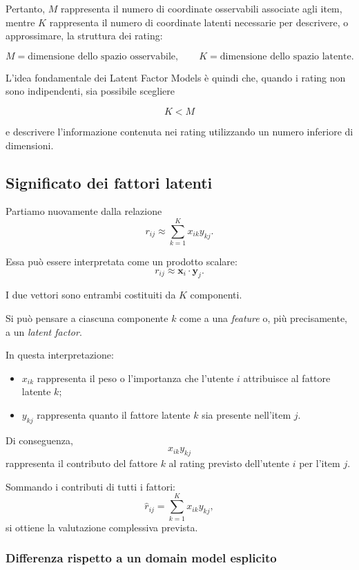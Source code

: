 Pertanto, \(M\) rappresenta il numero di coordinate osservabili associate agli item, mentre \(K\) rappresenta il numero di coordinate latenti necessarie per descrivere, o approssimare, la struttura dei rating:

\[
\boxed{
M=\text{dimensione dello spazio osservabile},
\qquad
K=\text{dimensione dello spazio latente}.
}
\]

L'idea fondamentale dei Latent Factor Models è quindi che, quando i rating non sono indipendenti, sia possibile scegliere

\[
K < M
\]

e descrivere l'informazione contenuta nei rating utilizzando un numero inferiore di dimensioni.
\subsection{Significato dei fattori latenti}

Partiamo nuovamente dalla relazione
\begin{equation*}
r_{ij}
\approx
\sum_{k=1}^{K} x_{ik}y_{kj}.
\end{equation*}

Essa può essere interpretata come un prodotto scalare:
\[
r_{ij}
\approx
\mathbf{x}_{i}\cdot\mathbf{y}_{j}.
\]

I due vettori sono entrambi costituiti da $K$ componenti.

Si può pensare a ciascuna componente $k$ come a una \emph{feature} o, più precisamente, a un \emph{latent factor}.

In questa interpretazione:
\begin{itemize}
    \item $x_{ik}$ rappresenta il peso o l'importanza che l'utente $i$ attribuisce al fattore latente $k$;
    \item $y_{kj}$ rappresenta quanto il fattore latente $k$ sia presente nell'item $j$.
\end{itemize}

Di conseguenza,
\[
x_{ik}y_{kj}
\]
rappresenta il contributo del fattore $k$ al rating previsto dell'utente $i$ per l'item $j$.

Sommando i contributi di tutti i fattori:
\[
\widehat r_{ij}
=
\sum_{k=1}^{K}x_{ik}y_{kj},
\]
si ottiene la valutazione complessiva prevista.

\subsubsection{Differenza rispetto a un domain model esplicito}

